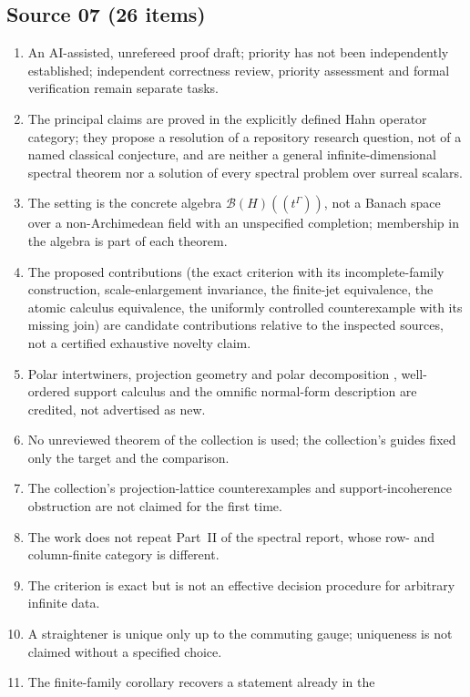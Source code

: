 \documentclass[11pt,letterpaper]{article}
\numberwithin{equation}{section}
\theoremstyle{definition}
\theoremstyle{remark}
\begin{document}
\subsection{Source 07 (26 items)}
\begin{enumerate}[leftmargin=*,widest=00,label=07.\arabic*]
\item An AI-assisted, unrefereed proof draft; priority has not been
independently established; independent correctness review, priority
assessment and formal verification remain separate tasks.
\item The principal claims are proved in the explicitly defined Hahn operator
category; they propose a resolution of a repository research question, not of
a named classical conjecture, and are neither a general
infinite-dimensional spectral theorem nor a solution of every spectral problem
over surreal scalars.
\item The setting is the concrete algebra $\mathcal B(H)((t^\Gamma))$, not a
Banach space over a non-Archimedean field with an unspecified completion;
membership in the algebra is part of each theorem.
\item The proposed contributions (the exact criterion with its
incomplete-family construction, scale-enlargement invariance, the finite-jet
equivalence, the atomic calculus equivalence, the uniformly controlled
counterexample with its missing join) are candidate contributions relative to
the inspected sources, not a certified exhaustive novelty claim.
\item Polar intertwiners, projection geometry and polar decomposition
\cite{Kato,CorachMaestripieri}, well-ordered support calculus \cite{Neumann}
and the omnific normal-form description \cite{LInnocenteMantova} are credited,
not advertised as new.
\item No unreviewed theorem of the collection is used; the collection's
guides fixed only the target and the comparison.
\item The collection's projection-lattice counterexamples and
support-incoherence obstruction are not claimed for the first time.
\item The work does not repeat Part~II of the spectral report, whose
row- and column-finite category is different.
\item The criterion is exact but is not an effective decision procedure for
arbitrary infinite data.
\item A straightener is unique only up to the commuting gauge; uniqueness is
not claimed without a specified choice.
\item The finite-family corollary recovers a statement already in the

\end{enumerate}
\end{document}
